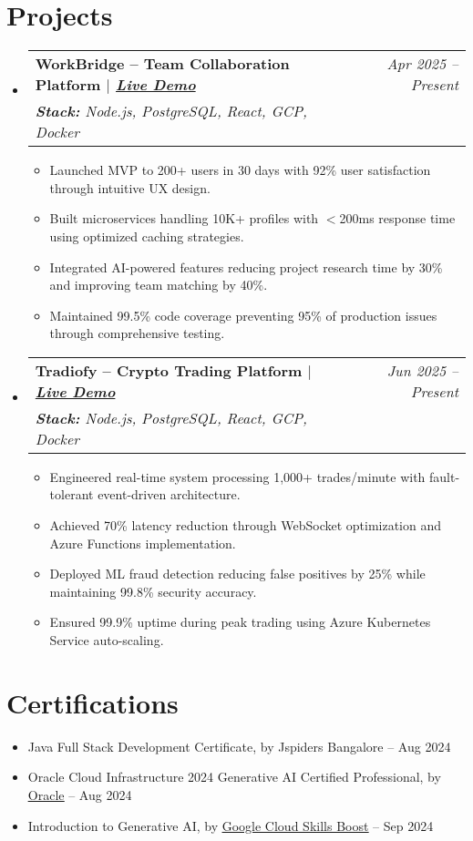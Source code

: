 \documentclass[letterpaper,11pt]{article}
\makeatletter
\newcommand{\resumeItem}[1]{
  \item\small{
    {#1 \vspace{-2pt}}
  }
}
\newcommand{\resumeProjectHeading}[3]{
    \item
    \begin{tabular*}{0.97\textwidth}[t]{l@{\extracolsep{\fill}}r}
      \textbf{#1} & \textit{\small #2} \\
      \textit{\small \textbf{Stack:} #3} & \\
    \end{tabular*}\vspace{-7pt}
}
\newcommand{\resumeSubHeadingListStart}{\begin{itemize}[leftmargin=0.15in, label={}]}
\newcommand{\resumeSubHeadingListEnd}{\end{itemize}}
\newcommand{\resumeItemListStart}{\begin{itemize}}
\newcommand{\resumeItemListEnd}{\end{itemize}\vspace{-5pt}}
\makeatother
\begin{document}
\section{Projects}
    \resumeSubHeadingListStart
      \resumeProjectHeading
          {WorkBridge -- Team Collaboration Platform $|$ \emph{\href{https://www.workbridgeco.com/}{Live Demo}}}
          {Apr 2025 -- Present}
          {Node.js, PostgreSQL, React, GCP, Docker}
          \resumeItemListStart
            \resumeItem{Launched MVP to 200+ users in 30 days with 92\% user satisfaction through intuitive UX design.}
      \resumeItem{Built microservices handling 10K+ profiles with $<$200ms response time using optimized caching strategies.}
      \resumeItem{Integrated AI-powered features reducing project research time by 30\% and improving team matching by 40\%.}
      \resumeItem{Maintained 99.5\% code coverage preventing 95\% of production issues through comprehensive testing.}
          \resumeItemListEnd
      \resumeProjectHeading
          {Tradiofy -- Crypto Trading Platform $|$ \emph{\href{https://tradiofy.netlify.app/}{Live Demo}}}
          {Jun 2025 -- Present}
          {Node.js, PostgreSQL, React, GCP, Docker}
          \resumeItemListStart
             \resumeItem{Engineered real-time system processing 1,000+ trades/minute with fault-tolerant event-driven architecture.}
      \resumeItem{Achieved 70\% latency reduction through WebSocket optimization and Azure Functions implementation.}
      \resumeItem{Deployed ML fraud detection reducing false positives by 25\% while maintaining 99.8\% security accuracy.}
      \resumeItem{Ensured 99.9\% uptime during peak trading using Azure Kubernetes Service auto-scaling.}
          \resumeItemListEnd
    \resumeSubHeadingListEnd


\section{Certifications}
\begin{itemize}[leftmargin=0.15in, label={}, itemsep=0pt]
    \item  Java Full Stack Development Certificate, by Jspiders Bangalore -- Aug 2024
\item Oracle Cloud Infrastructure 2024 Generative AI Certified Professional, by 
    \underline{\textcolor{blue}{\href{https://catalog-education.oracle.com/pls/certview/sharebadge?id=2FD55AA64EF5240AFF31F10E95EB6D46DCAC92326D8E2ABB457EE7AC8C3CAF65s}{Oracle}}} -- Aug 2024
    \item Introduction to Generative AI, by 
    \underline{\textcolor{blue}{\href{https://www.cloudskillsboost.google/public_profiles/8517b357-d6bc-4c47-a892-438e14ac4996/badges/11241975?utm_medium=social&utm_source=linkedin&utm_campaign=ql-social-share}{Google Cloud Skills Boost}}} -- Sep 2024
\end{itemize}
\end{document}
